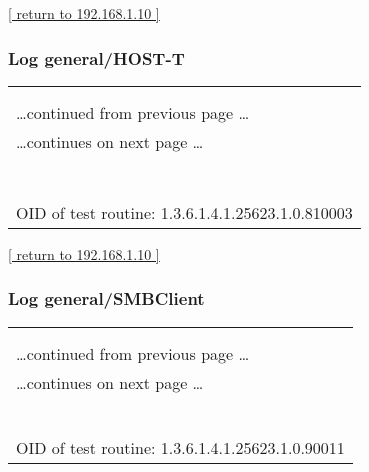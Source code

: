\documentclass{article}
\begin{document}
\begin{footnotesize}\hyperref[host:192.168.1.10]{[ return to 192.168.1.10 ]}\end{footnotesize}
\subsubsection{Log general/HOST-T}
\label{port:192.168.1.10 general/HOST-T Log}

\begin{longtable}{|p{}|}
\hline
\rowcolor{openvas_log}{\color{white}{Log (CVSS: 0.0) }}\\
\rowcolor{openvas_log}{\color{white}{NVT: Host Summary}}\\
\hline
\endfirsthead
\hfill\ldots continued from previous page \ldots \\
\hline
\endhead
\hline
\ldots continues on next page \ldots \\
\endfoot
\hline
\endlastfoot
\\
\rowcolor{white}{\verb=traceroute:192.168.1.1,192.168.1.10=}\\
\rowcolor{white}{\verb=TCP ports:80,110,445,993,22,8080,995,139,53,143=}\\
\rowcolor{white}{\verb=UDP ports:=}\\
\rowcolor{white}{\verb==}\\
\rowcolor{white}{\verb==}\\
\\
OID of test routine: 1.3.6.1.4.1.25623.1.0.810003\\
\end{longtable}

\begin{footnotesize}\hyperref[host:192.168.1.10]{[ return to 192.168.1.10 ]}\end{footnotesize}
\subsubsection{Log general/SMBClient}
\label{port:192.168.1.10 general/SMBClient Log}

\begin{longtable}{|p{}|}
\hline
\rowcolor{openvas_log}{\color{white}{Log (CVSS: 0.0) }}\\
\rowcolor{openvas_log}{\color{white}{NVT: SMB Test}}\\
\hline
\endfirsthead
\hfill\ldots continued from previous page \ldots \\
\hline
\endhead
\hline
\ldots continues on next page \ldots \\
\endfoot
\hline
\endlastfoot
\\
\rowcolor{white}{\verb=The tool "smbclient" is not available for openvasd.=}\\
\rowcolor{white}{\verb=Therefore none of the tests using smbclient are executed.=}\\
\rowcolor{white}{\verb==}\\
\rowcolor{white}{\verb==}\\
\\
OID of test routine: 1.3.6.1.4.1.25623.1.0.90011\\
\end{longtable}
\end{document}
